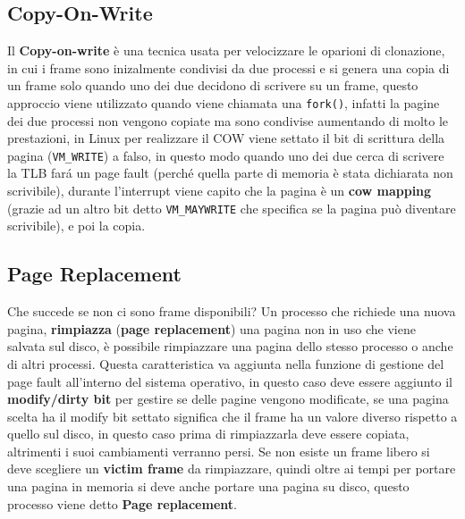 \documentclass[12pt]{article}
\begin{document}
\subsection{Copy-On-Write}
Il \textbf{Copy-on-write} \`e una tecnica usata per velocizzare le oparioni di clonazione, in cui i frame sono inizalmente condivisi da due processi e si genera una copia di un frame solo quando uno dei due decidono di scrivere su un frame, questo approccio viene utilizzato quando viene chiamata una \texttt{fork()}, infatti la pagine dei due processi non vengono copiate ma  sono condivise aumentando di molto le prestazioni, in Linux per realizzare il COW viene settato il bit di scrittura della pagina (\texttt{VM\_WRITE}) a falso, in questo modo quando uno dei due cerca di scrivere la TLB far\'a un page fault (perch\'e quella parte di memoria \`e stata dichiarata non scrivibile), durante l'interrupt viene capito che la pagina \`e un \textbf{cow mapping} (grazie ad un altro bit detto \texttt{VM\_MAYWRITE} che specifica se la pagina pu\`o diventare scrivibile), e poi la copia.

\subsection{Page Replacement}
Che succede se non ci sono frame disponibili? Un processo che richiede una nuova pagina, \textbf{rimpiazza} (\textbf{page replacement}) una pagina non in uso che viene salvata sul disco, \`e possibile rimpiazzare una pagina dello stesso processo o anche di altri processi. Questa caratteristica va aggiunta nella funzione di gestione del page fault all'interno del sistema operativo, in questo caso deve essere aggiunto il \textbf{modify/dirty bit} per gestire se delle pagine vengono modificate, se una pagina scelta ha il modify bit settato significa che il frame ha un valore diverso rispetto a quello sul disco, in questo caso prima di rimpiazzarla deve essere copiata, altrimenti i suoi cambiamenti verranno persi. Se non esiste un frame libero si deve scegliere un \textbf{victim frame} da rimpiazzare, quindi oltre ai tempi per portare una pagina in memoria si deve anche portare una pagina su disco, questo processo viene detto \textbf{Page replacement}.
\end{document}
